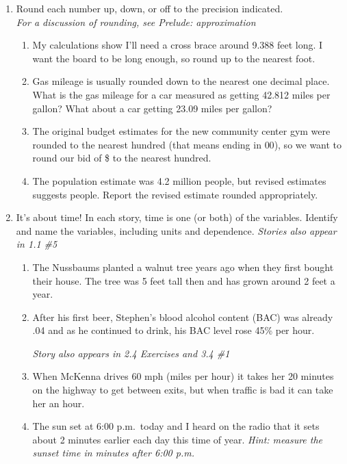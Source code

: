 \begin{enumerate}
\item  Round each number up, down, or off to the precision indicated. \\  \emph{For a discussion of rounding, see Prelude:  approximation}
\begin{enumerate}
\item My calculations show I'll need a cross brace around 9.388 feet long. I want the board to be long enough, so round up to the nearest foot. \vfill
\item  Gas mileage is usually rounded down to the nearest one decimal place.  What is the gas mileage for a car measured as getting 42.812 miles per gallon?  What about a car getting 23.09 miles per gallon? \vfill
\item  The original budget estimates for the new community center gym were rounded to the nearest hundred (that means ending in $00$), so we want to round our bid of \$ to the nearest hundred.   \vfill
\item The population estimate was 4.2 million people, but revised estimates suggests  people.  Report the revised estimate rounded appropriately. \vfill
\end{enumerate}

\newpage %

\item  It's about time!  In each story, time is one (or both) of the variables.  Identify and name the variables, including units and dependence.  \hfill \emph{Stories also appear in 1.1 \#5}
\begin{enumerate}
\item The Nussbaums planted a walnut tree years ago when they first bought their house.  The tree was 5 feet tall then and has grown around 2 feet a year. \vfill
\item After his first beer, Stephen's blood alcohol content (BAC) was already .04 and as he continued to drink, his BAC level rose 45\% per hour. 

\hfill \emph{Story also appears in 2.4 Exercises and 3.4 \#1} 
 \vfill
\item When McKenna drives 60 mph (miles per hour) it takes her 20 minutes on the highway to get between exits, but when traffic is bad it can take her an hour.\vfill
\item The sun set at 6:00 p.m.\ today and I heard on the radio that it sets about 2 minutes earlier each day this time of year.  \emph{Hint: measure the sunset time in minutes after 6:00 p.m.}\vfill
\end{enumerate} 

\end{enumerate}

